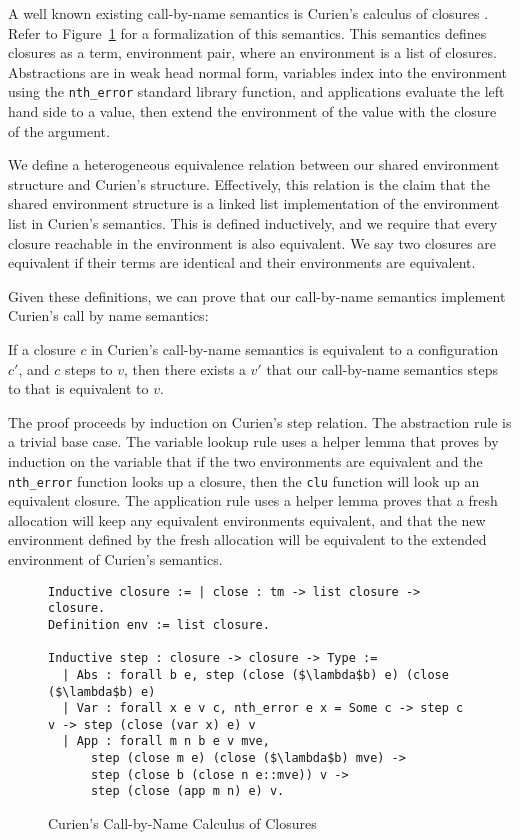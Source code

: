 A well known existing call-by-name semantics is Curien's calculus of closures
\cite{curien}. Refer to Figure~\ref{fig:curien} for a formalization of this
semantics. This semantics defines closures as a term, environment pair, where an
environment is a list of closures. Abstractions are in weak head normal form,
variables index into the environment using the \texttt{nth\_error} standard
library function, and applications evaluate the left hand side to a value, then
extend the environment of the value with the closure of the argument. 

We define a heterogeneous equivalence relation between our shared environment
structure and Curien's structure. Effectively, this relation is the claim that
the shared environment structure is a linked list implementation of the
environment list in Curien's semantics. This is defined inductively, and we
require that every closure reachable in the environment is also equivalent.  We
say two closures are equivalent if their terms are identical and their
environments are equivalent. 

Given these definitions, we can prove that our call-by-name semantics implement
Curien's call by name semantics: 

\begin{theorem}
If a closure $c$ in Curien's call-by-name semantics is equivalent to a
configuration $c'$, and $c$ steps to $v$, then there exists a $v'$ that our
call-by-name semantics steps to that is equivalent to $v$.
\end{theorem}
\begin{proofoutline}
The proof proceeds by induction on Curien's step relation. The abstraction rule
is a trivial base case. The variable lookup rule uses a helper lemma that proves
by induction on the variable that if the two environments are equivalent and the
\texttt{nth\_error} function looks up a closure, then the \texttt{clu} function
will look up an equivalent closure. The application rule uses a helper lemma
proves that a fresh allocation will keep any equivalent environments equivalent,
and that the new environment defined by the fresh allocation will be equivalent
to the extended environment of Curien's semantics.
\end{proofoutline}

\begin{figure}
\begin{lstlisting}
Inductive closure := | close : tm -> list closure -> closure. 
Definition env := list closure.

Inductive step : closure -> closure -> Type := 
  | Abs : forall b e, step (close ($\lambda$b) e) (close ($\lambda$b) e)
  | Var : forall x e v c, nth_error e x = Some c -> step c v -> step (close (var x) e) v
  | App : forall m n b e v mve,
      step (close m e) (close ($\lambda$b) mve) ->
      step (close b (close n e::mve)) v ->
      step (close (app m n) e) v.
\end{lstlisting}
\caption{Curien's Call-by-Name Calculus of Closures}
\label{fig:curien}
\end{figure}



